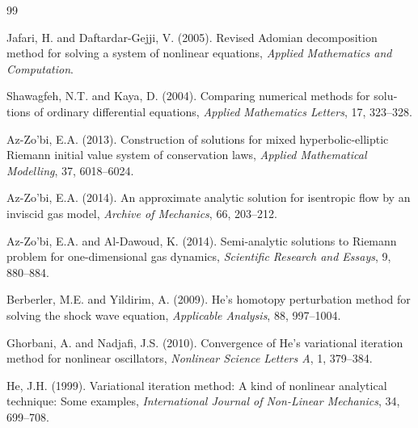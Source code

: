 \begin{thebibliography}{99}
\begin{otherlanguage}{english}
	Jafari, H. and Daftardar-Gejji, V. (2005).
	Revised Adomian decomposition method for solving a system of nonlinear equations,
	\textit{Applied Mathematics and Computation}.
	
	Shawagfeh, N.T. and Kaya, D. (2004).
	Comparing numerical methods for solutions of ordinary differential equations,
	\textit{Applied Mathematics Letters}, 17, 323--328.
	
	Az-Zo’bi, E.A. (2013).
	Construction of solutions for mixed hyperbolic-elliptic Riemann initial value system of conservation laws,
	\textit{Applied Mathematical Modelling}, 37, 6018--6024.
	
	Az-Zo’bi, E.A. (2014).
	An approximate analytic solution for isentropic flow by an inviscid gas model,
	\textit{Archive of Mechanics}, 66, 203--212.
	
	Az-Zo’bi, E.A. and Al-Dawoud, K. (2014).
	Semi-analytic solutions to Riemann problem for one-dimensional gas dynamics,
	\textit{Scientific Research and Essays}, 9, 880--884.
	
	Berberler, M.E. and Yildirim, A. (2009).
	He’s homotopy perturbation method for solving the shock wave equation,
	\textit{Applicable Analysis}, 88, 997--1004.
	
	Ghorbani, A. and Nadjafi, J.S. (2010).
	Convergence of He’s variational iteration method for nonlinear oscillators,
	\textit{Nonlinear Science Letters A}, 1, 379--384.
	
	He, J.H. (1999).
	Variational iteration method: A kind of nonlinear analytical technique: Some examples,
	\textit{International Journal of Non-Linear Mechanics}, 34, 699--708.
\end{otherlanguage}
\end{thebibliography}